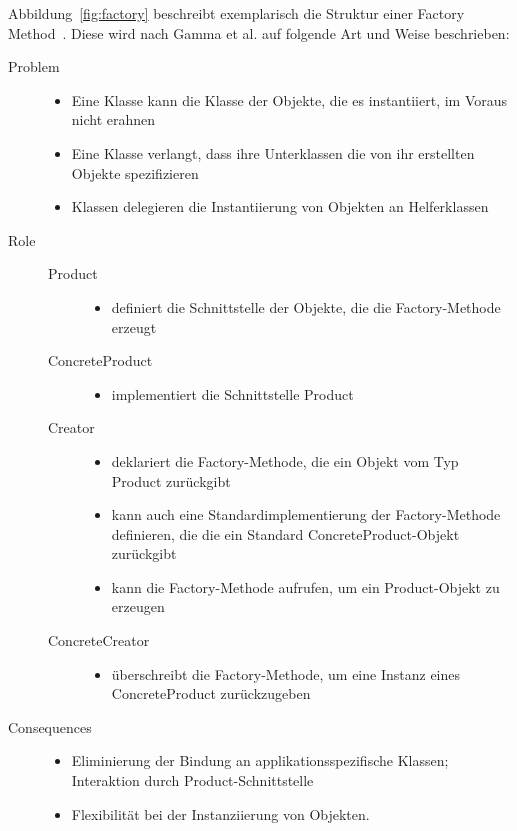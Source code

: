 Abbildung~\ref{fig:factory} beschreibt exemplarisch die Struktur einer Factory Method~\cite[S. 108]{gamma1994design}.
Diese wird nach Gamma et al. auf folgende Art und Weise beschrieben:

\begin{description}
    \item[Problem] \hfill 
    \begin{itemize}
        \item Eine Klasse kann die Klasse der Objekte, die es instantiiert, im Voraus nicht erahnen
        \item Eine Klasse verlangt, dass ihre Unterklassen die von ihr erstellten Objekte spezifizieren
        \item Klassen delegieren die Instantiierung von Objekten an Helferklassen
    \end{itemize}

    \item[Role] \hfill
    \begin{description}
        \item[Product] \hfill
        \begin{itemize}
            \item definiert die Schnittstelle der Objekte, die die Factory-Methode erzeugt
        \end{itemize}
        \item[ConcreteProduct] \hfill
        \begin{itemize}
            \item implementiert die Schnittstelle Product
        \end{itemize}
        \item[Creator] \hfill 
        \begin{itemize}
            \item deklariert die Factory-Methode, die ein Objekt vom Typ Product zurückgibt
            \item kann auch eine Standardimplementierung der Factory-Methode definieren, die die ein Standard ConcreteProduct-Objekt zurückgibt
            \item kann die Factory-Methode aufrufen, um ein Product-Objekt zu erzeugen
        \end{itemize}
        \item[ConcreteCreator] \hfill
        \begin{itemize}
            \item überschreibt die Factory-Methode, um eine Instanz eines ConcreteProduct zurückzugeben
        \end{itemize}
    \end{description}

    \item[Consequences] \hfill
    \begin{itemize}
        \item Eliminierung der Bindung an applikationsspezifische Klassen; Interaktion durch Product-Schnittstelle
        \item Flexibilität bei der Instanziierung von Objekten.
    \end{itemize}

\end{description}


